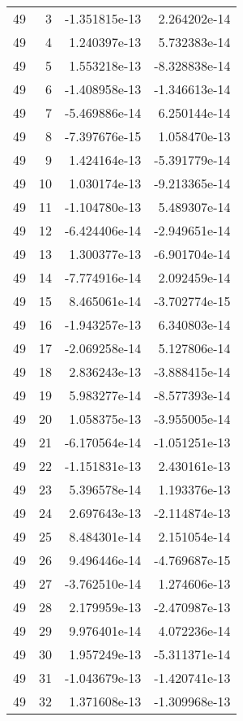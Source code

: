 \begin{tabular}{rrrr}
  49 &    3 & -1.351815e-13 &  2.264202e-14 \\
  49 &    4 &  1.240397e-13 &  5.732383e-14 \\
  49 &    5 &  1.553218e-13 & -8.328838e-14 \\
  49 &    6 & -1.408958e-13 & -1.346613e-14 \\
  49 &    7 & -5.469886e-14 &  6.250144e-14 \\
  49 &    8 & -7.397676e-15 &  1.058470e-13 \\
  49 &    9 &  1.424164e-13 & -5.391779e-14 \\
  49 &   10 &  1.030174e-13 & -9.213365e-14 \\
  49 &   11 & -1.104780e-13 &  5.489307e-14 \\
  49 &   12 & -6.424406e-14 & -2.949651e-14 \\
  49 &   13 &  1.300377e-13 & -6.901704e-14 \\
  49 &   14 & -7.774916e-14 &  2.092459e-14 \\
  49 &   15 &  8.465061e-14 & -3.702774e-15 \\
  49 &   16 & -1.943257e-13 &  6.340803e-14 \\
  49 &   17 & -2.069258e-14 &  5.127806e-14 \\
  49 &   18 &  2.836243e-13 & -3.888415e-14 \\
  49 &   19 &  5.983277e-14 & -8.577393e-14 \\
  49 &   20 &  1.058375e-13 & -3.955005e-14 \\
  49 &   21 & -6.170564e-14 & -1.051251e-13 \\
  49 &   22 & -1.151831e-13 &  2.430161e-13 \\
  49 &   23 &  5.396578e-14 &  1.193376e-13 \\
  49 &   24 &  2.697643e-13 & -2.114874e-13 \\
  49 &   25 &  8.484301e-14 &  2.151054e-14 \\
  49 &   26 &  9.496446e-14 & -4.769687e-15 \\
  49 &   27 & -3.762510e-14 &  1.274606e-13 \\
  49 &   28 &  2.179959e-13 & -2.470987e-13 \\
  49 &   29 &  9.976401e-14 &  4.072236e-14 \\
  49 &   30 &  1.957249e-13 & -5.311371e-14 \\
  49 &   31 & -1.043679e-13 & -1.420741e-13 \\
  49 &   32 &  1.371608e-13 & -1.309968e-13 \\

\end{tabular}
